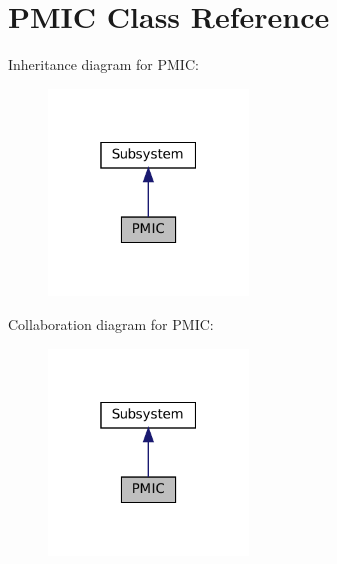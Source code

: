 \hypertarget{class_p_m_i_c}{}\section{P\+M\+IC Class Reference}
\label{class_p_m_i_c}


Inheritance diagram for P\+M\+IC\+:\nopagebreak
\begin{figure}[H]
\begin{center}
\leavevmode
\includegraphics[width=151pt]{class_p_m_i_c__inherit__graph}
\end{center}
\end{figure}


Collaboration diagram for P\+M\+IC\+:\nopagebreak
\begin{figure}[H]
\begin{center}
\leavevmode
\includegraphics[width=151pt]{class_p_m_i_c__coll__graph}
\end{center}
\end{figure}
